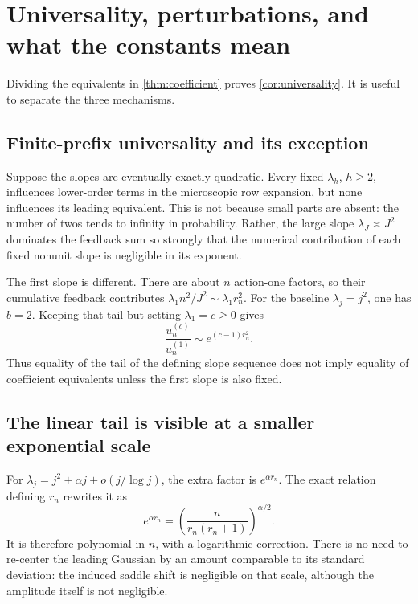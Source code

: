 \documentclass[11pt,a4paper]{article}
\theoremstyle{definition}
\numberwithin{equation}{section}
\begin{document}
\section{Universality, perturbations, and what the constants mean}
\label{sec:universality}
Dividing the equivalents in \cref{thm:coefficient} proves
\cref{cor:universality}. It is useful to separate the three mechanisms.

\subsection{Finite-prefix universality and its exception}
Suppose the slopes are eventually exactly quadratic. Every fixed
\(\lambda_h\), \(h\ge2\), influences lower-order terms in the
microscopic row expansion, but none influences its leading equivalent.
This is not because small parts are absent: the number of twos tends to
infinity in probability. Rather, the large slope \(\lambda_J\asymp J^2\)
dominates the feedback sum so strongly that the numerical contribution
of each fixed nonunit slope is negligible in its exponent.

The first slope is different. There are about \(n\) action-one factors,
so their cumulative feedback contributes
\(\lambda_1 n^2/J^2\sim\lambda_1r_n^2\).
For the baseline \(\lambda_j=j^2\), one has \(b=2\). Keeping that tail
but setting \(\lambda_1=c\ge0\) gives
\begin{equation}
 \frac{u_n^{(c)}}{u_n^{(1)}}\sim e^{(c-1)r_n^2}.
 \label{eq:first-slope-example}
\end{equation}
Thus equality of the tail of the defining slope sequence does not imply
equality of coefficient equivalents unless the first slope is also fixed.

\subsection{The linear tail is visible at a smaller exponential scale}
For \(\lambda_j=j^2+\alpha j+o(j/\log j)\), the extra factor is
\(e^{\alpha r_n}\). The exact relation defining \(r_n\) rewrites it as
\begin{equation}
 e^{\alpha r_n}
       =\left(\frac{n}{r_n(r_n+1)}\right)^{\alpha/2}.
 \label{eq:linear-tail-factor}
\end{equation}
It is therefore polynomial in \(n\), with a logarithmic correction.
There is no need to re-center the leading Gaussian by an amount comparable
to its standard deviation: the induced saddle shift is negligible on that
scale, although the amplitude itself is not negligible.
\end{document}
